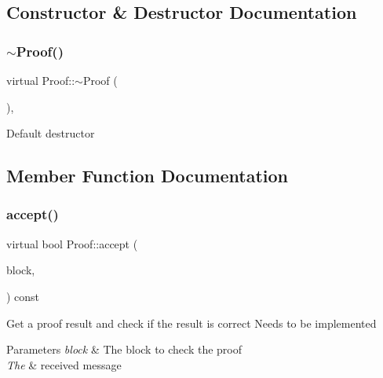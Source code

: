 \subsection{Constructor \& Destructor Documentation}
\mbox{\label{classProof_a7d4b4e1b7e891dc1d437ef4095f778df}} 
\subsubsection{\texorpdfstring{$\sim$\+Proof()}{~Proof()}}
{\footnotesize\ttfamily virtual Proof\+::$\sim$\+Proof (\begin{DoxyParamCaption}{ }\end{DoxyParamCaption})\hspace{0.3cm}{\ttfamily [virtual]}, {\ttfamily [default]}}

Default destructor 

\subsection{Member Function Documentation}
\mbox{\label{classProof_a358b3883eb33b8ecc93f74cb6313679a}} 
\subsubsection{\texorpdfstring{accept()}{accept()}}
{\footnotesize\ttfamily virtual bool Proof\+::accept (\begin{DoxyParamCaption}\item[{\mbox{\hyperlink{classBlock}{Block}} $\ast$}]{block,  }\item[{\mbox{\hyperlink{classMessage}{Message}} $\ast$}]{ }\end{DoxyParamCaption}) const\hspace{0.3cm}{\ttfamily [pure virtual]}}

Get a proof result and check if the result is correct Needs to be implemented


\begin{DoxyParams}{Parameters}
{\em block} & The block to check the proof \\
\hline
{\em The} & received message \\
\hline
\end{DoxyParams}


